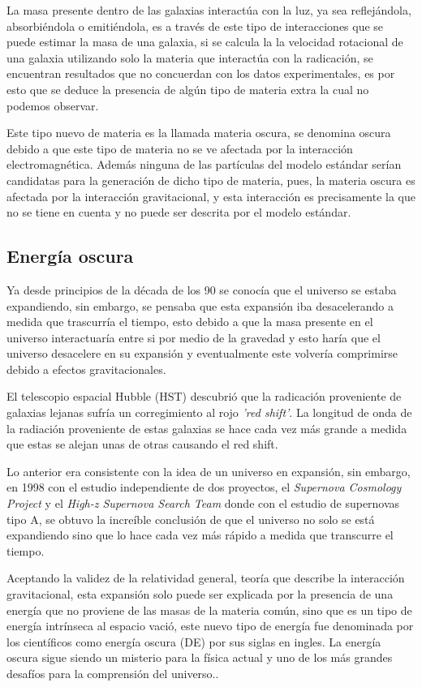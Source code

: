 \documentclass[journal]{IEEEtran}
\begin{document}
La masa presente dentro de las galaxias interactúa con la luz, ya sea reflejándola, absorbiéndola o emitiéndola, es a través de este tipo de interacciones que se puede estimar la masa de una galaxia, si se calcula la la velocidad rotacional de una galaxia utilizando solo la materia que interactúa con la radicación, se encuentran resultados que no concuerdan con los datos experimentales, es por esto que se deduce la presencia de algún tipo de materia extra la cual no podemos observar.

Este tipo nuevo de materia es la llamada materia oscura, se denomina oscura debido a que este tipo de materia no se ve afectada por la interacción electromagnética. Además ninguna de las partículas del modelo estándar serían candidatas para la generación de dicho tipo de materia, pues, la materia oscura es afectada por la interacción gravitacional, y esta interacción es precisamente la que no se tiene en cuenta y no puede ser descrita por el modelo estándar.

\subsection{Energía oscura}

Ya desde principios de la década de los 90 se conocía que el universo se estaba expandiendo, sin embargo, se pensaba que esta expansión iba desacelerando a medida que trascurría el tiempo, esto debido a que la masa presente en el universo interactuaría entre si por medio de la gravedad y esto haría que el universo desacelere en su expansión y eventualmente este volvería comprimirse debido a efectos gravitacionales.

 El telescopio espacial Hubble (HST) descubrió que la radicación proveniente de galaxias lejanas sufría un corregimiento al rojo \emph{'red shift'}. La longitud de onda de la radiación proveniente de estas galaxias se hace cada vez más grande a medida que estas se alejan unas de otras causando el red shift. 
 
 Lo anterior era consistente con la idea de un universo en expansión, sin embargo, en 1998 con el estudio independiente de dos proyectos, el \emph{Supernova Cosmology Project} y el \emph{High-z Supernova Search Team} donde con el estudio de supernovas tipo A, se obtuvo la increíble conclusión de que el universo no solo se está expandiendo sino que lo hace cada vez más rápido a medida que transcurre el tiempo.

Aceptando la validez de la relatividad general, teoría que describe la interacción gravitacional, esta expansión solo puede ser explicada por la presencia de una energía que no proviene de las masas de la materia común, sino que es un tipo de energía intrínseca al espacio vació, este nuevo tipo de energía fue denominada por los científicos como energía oscura (DE) por sus siglas en ingles. La energía oscura sigue siendo un misterio para la física actual y uno de los más grandes desafíos para la comprensión del universo..
\end{document}
